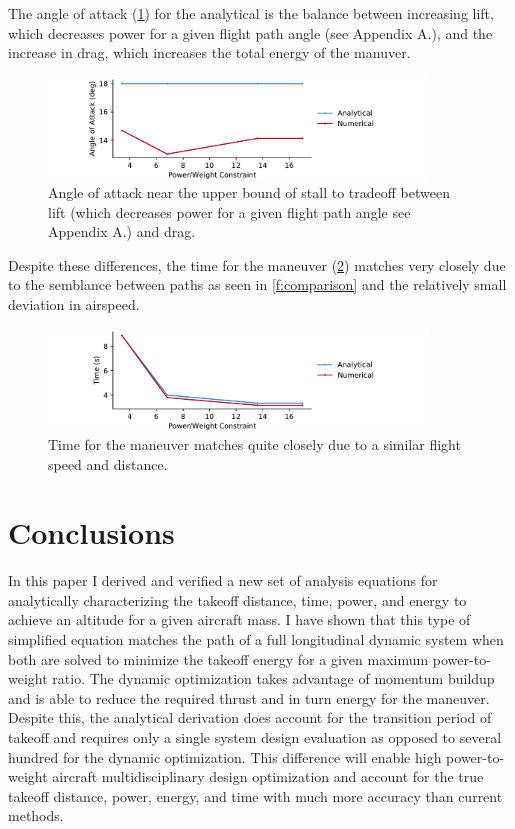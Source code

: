 \documentclass[10pt,english]{article}
\begin{document}
The angle of attack (\cref{f:alpha_compare}) for the analytical is the balance between increasing lift, which decreases power for a given flight path angle (see Appendix A.),  and the increase in drag, which increases the total energy of the manuver.  

\begin{figure}[H]
\centering
\includegraphics[trim={.0cm 0.0cm .0cm 0cm},clip,width=0.9\textwidth]{alpha_compare}
\vspace{-5pt}
\caption{Angle of attack near the upper bound of stall to tradeoff between lift (which decreases power for a given flight path angle see Appendix A.) and drag.}
\label{f:alpha_compare}
\end{figure}

Despite these differences, the time for the maneuver (\cref{f:t_compare}) matches very closely due to the semblance between paths as seen in \cref{f:comparison} and the relatively small deviation in airspeed. 


\begin{figure}[H]
\centering
\includegraphics[trim={.0cm 0.0cm .0cm 0cm},clip,width=0.9\textwidth]{time_compare}
\vspace{-5pt}
\caption{Time for the maneuver matches quite closely due to a similar flight speed and distance.}
\label{f:t_compare}
\end{figure}

\section{Conclusions}
In this paper I derived and verified a new set of analysis equations for analytically characterizing the takeoff distance, time, power, and energy to achieve an altitude for a given aircraft mass.  I have shown that this type of simplified equation matches the path of a full longitudinal dynamic system when both are solved to minimize the takeoff energy for a given maximum power-to-weight ratio.  The dynamic optimization takes advantage of momentum buildup and is able to reduce the required thrust and in turn energy for the maneuver.  Despite this, the analytical derivation does account for the transition period of takeoff and requires only a single system design evaluation as opposed to several hundred for the dynamic optimization.  This difference will enable high power-to-weight aircraft multidisciplinary design optimization and account for the true takeoff distance, power, energy, and time with much more accuracy than current methods.  
\end{document}
